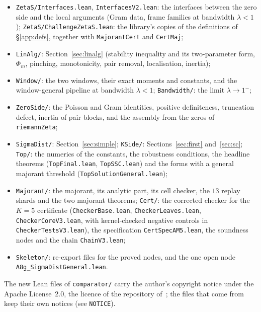 \begin{itemize}
\item \texttt{ZetaS/Interfaces.lean}, \texttt{InterfacesV2.lean}: the interfaces between the zero side and the local arguments (Gram data,
frame families at bandwidth $\lambda<1$); \texttt{ZetaS/ChallengeZetaS.lean}: the library's copies of the definitions of \S\ref{app:defs},
together with \texttt{MajorantCert} and \texttt{CertMaj};
\item \texttt{LinAlg/}: Section~\ref{sec:linalg} (stability inequality and its two-parameter form, $\Phi_m$, pinching, monotonicity, pair
removal, localisation, inertia);
\item \texttt{Window/}: the two windows, their exact moments and constants, and the window-general pipeline at bandwidth $\lambda<1$;
\texttt{Bandwidth/}: the limit $\lambda\to1^-$;
\item \texttt{ZeroSide/}: the Poisson and Gram identities, positive definiteness, truncation defect, inertia of pair blocks, and the assembly
from the zeros of \texttt{riemannZeta};
\item \texttt{SigmaDist/}: Section~\ref{sec:simple}; \texttt{KSide/}: Sections~\ref{sec:first} and~\ref{sec:sc}; \texttt{Top/}: the numerics of
the constants, the robustness conditions, the headline theorems (\texttt{TopFinal.lean}, \texttt{TopSSC.lean}) and the forms with a general
majorant threshold (\texttt{TopSolutionGeneral.lean});
\item \texttt{Majorant/}: the majorant, its analytic part, its cell checker, the $13$ replay shards and the two majorant theorems;
\texttt{Cert/}: the corrected checker for the $K=5$ certificate (\texttt{CheckerBase.lean}, \texttt{CheckerLeaves.lean},
\texttt{CheckerCoreV3.lean}, with kernel-checked negative controls in \texttt{CheckerTestsV3.lean}), the specification
\texttt{CertSpecAM5.lean}, the soundness nodes and the chain \texttt{ChainV3.lean};
\item \texttt{Skeleton/}: re-export files for the proved nodes, and the one open node \texttt{A8g\_SigmaDistGeneral.lean}.
\end{itemize}
The new Lean files of \texttt{comparator/} carry the author's copyright notice under the Apache License~2.0, the licence of the repository
of~\cite{AF}; the files that come from~\cite{AF} keep their own notices (see \texttt{NOTICE}).
